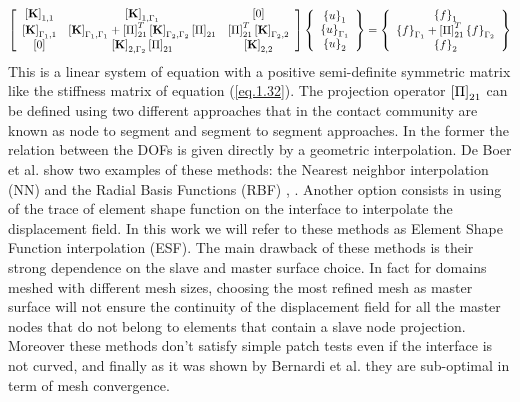   \begin{equation}
  \label{eq.33}
  \begin{aligned}
  \left[ \begin{array}{ccc} 
      \left[{\mathbf{K}}\right]_{1,1} & \left[{\mathbf{K}}\right]_{1,\Gamma_1} & \left[{0}\right] \\
     \left[{\mathbf{K}}\right]_{\Gamma_1,1} & \left[{\mathbf{K}}\right]_{\Gamma_1,\Gamma_1}+ \left[{\Pi}\right]_{21}^T\left[{\mathbf{K}}\right]_{\Gamma_2,\Gamma_2}\left[{\Pi}\right]_{21} & \left[{\Pi}\right]_{21}^T\left[{\mathbf{K}}\right]_{\Gamma_2,2}\\   
      \left[{0}\right] & \left[{\mathbf{K}}\right]_{2,\Gamma_2}\left[{\Pi}\right]_{21} & \left[{\mathbf{K}}\right]_{2,2}\end{array} \right] \left\lbrace \begin{array}{c} \left\lbrace{u}\right \rbrace_1\\\left\lbrace{u}\right \rbrace_{\Gamma_1}\\\left\lbrace{u}\right \rbrace_2
      \end{array}\right\rbrace= \left\lbrace\begin{array}{c} \left\lbrace{f}\right \rbrace_1\\\left\lbrace{f}\right \rbrace_{\Gamma_1}+\left[{\Pi}\right]_{21}^T\left\lbrace{f}\right \rbrace_{\Gamma_2}\\\left\lbrace{f}\right \rbrace_2
      \end{array}\right\rbrace
  \end{aligned}
  \end{equation}
  This is a linear system of equation with a positive semi-definite symmetric matrix like the stiffness matrix of equation (\ref{eq.1.32}). 
  The projection operator $\left[{\Pi}\right]_{21}$ can be defined using two different approaches that in the contact community are known as node to segment and segment to segment approaches. In the former the relation between the DOFs is given directly by a geometric interpolation. De Boer et al. \cite{de2007review} show two examples of these methods: the Nearest neighbor interpolation (NN) \cite{thevenaz2000interpolation} and the Radial Basis Functions (RBF) \cite{beckert2001multivariate}, \cite{smith2000evaluation}. Another option consists in using of the trace of element shape function on the interface to interpolate the displacement field. In this work we will refer to these methods as Element Shape Function interpolation (ESF).
  The main drawback of these methods is their strong dependence on the slave and master surface choice. In fact for domains meshed with different mesh sizes, choosing the most refined mesh as master surface will not ensure the continuity of the displacement field for all the master nodes that do not belong to elements that contain a slave node projection. Moreover these methods don't satisfy simple patch tests even if the interface is not curved, and finally as it was shown by Bernardi et al. \cite{bernardi1989new} they are sub-optimal in term of mesh convergence.
